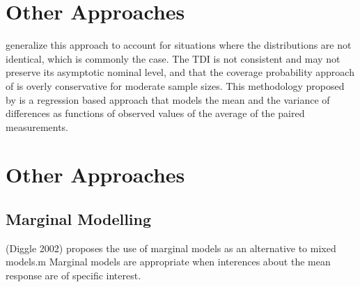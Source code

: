 \documentclass[12pt, a4paper]{report}
\theoremstyle{plain}
\theoremstyle{definition}
\theoremstyle{remark}
\begin{document}
\section{Other Approaches}


\citet{pkcng} generalize this approach to account for situations
where the distributions are not identical, which is commonly the
case. The TDI is not consistent and may not preserve its
asymptotic nominal level, and that the coverage probability
approach of \citet{lin2002} is overly conservative for moderate
sample sizes. This methodology proposed by \citet{pkcng} is a
regression based approach that models the mean and the variance of
differences as functions of observed values of the average of the
paired measurements.

\section{Other Approaches}


\subsection{Marginal Modelling}
(Diggle 2002) proposes the use of marginal models as an
alternative to mixed models.m Marginal models are appropriate when
interences about the mean response are of specific interest.





	


\end{document}
